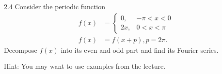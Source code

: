 
\begin{problem}{2.4}
 Consider the periodic function
\begin{align*}
  f(x) &= \begin{cases}
  0, & -\pi < x < 0\\
  2 x, & 0 < x < \pi
  \end{cases} \\
  f(x) &= f(x+p), p = 2\pi
.\end{align*}
Decompose $f(x)$ into its even and odd part and find its Fourier series.

Hint: You may want to use examples from the lecture.
\end{problem}

